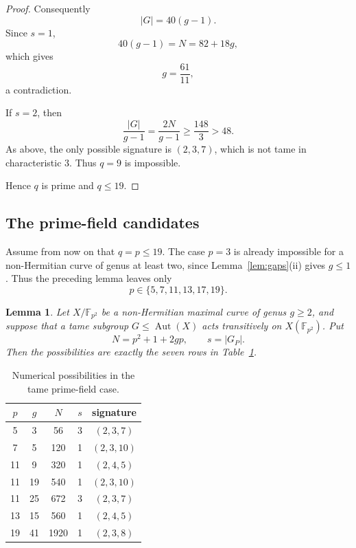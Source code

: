 \documentclass[11pt]{amsart}
\newtheorem{lemma}[theorem]{Lemma}
\theoremstyle{remark}
\newcommand{\F}{\mathbb F}
\newcommand{\Aut}{\operatorname{Aut}}
\begin{document}
\begin{proof}
Consequently
\[
|G|=40(g-1).
\]
Since $s=1$,
\[
40(g-1)=N=82+18g,
\]
which gives
\[
g=\frac{61}{11},
\]
a contradiction.

If $s=2$, then
\[
\frac{|G|}{g-1}
=
\frac{2N}{g-1}
\ge
\frac{148}{3}
>
48.
\]
As above, the only possible signature is $(2,3,7)$, which is not
tame in characteristic $3$. Thus $q=9$ is impossible.

Hence $q$ is prime and $q\le19$.
\end{proof}



\subsection{The prime-field candidates}

Assume from now on that $q=p\le19$. The case $p=3$ is already
impossible for a non-Hermitian curve of genus at least two, since
Lemma~\ref{lem:gaps}(ii) gives $g\le1$. Thus the preceding lemma leaves
only
\[
p\in\{5,7,11,13,17,19\}.
\]

\begin{lemma}\label{lem:tamecandidates}
Let $X/\F_{p^2}$ be a non-Hermitian maximal curve of genus $g\ge2$,
and suppose that a tame subgroup $G\le\Aut(X)$ acts transitively on
$X(\F_{p^2})$. Put
\[
N=p^2+1+2gp,\qquad
s=|G_P|.
\]
Then the possibilities are exactly the seven rows in
Table~\ref{tab:candidates}.
\end{lemma}

\begin{table}[ht]
\centering
\caption{Numerical possibilities in the tame prime-field case.}
\label{tab:candidates}
\begin{tabular}{ccccc}
\toprule
$p$ & $g$ & $N$ & $s$ & signature\\
\midrule
5  & 3  & 56   & 3 & $(2,3,7)$\\
7  & 5  & 120  & 1 & $(2,3,10)$\\
11 & 9  & 320  & 1 & $(2,4,5)$\\
11 & 19 & 540  & 1 & $(2,3,10)$\\
11 & 25 & 672  & 3 & $(2,3,7)$\\
13 & 15 & 560  & 1 & $(2,4,5)$\\
19 & 41 & 1920 & 1 & $(2,3,8)$\\
\bottomrule
\end{tabular}
\end{table}
\end{document}

